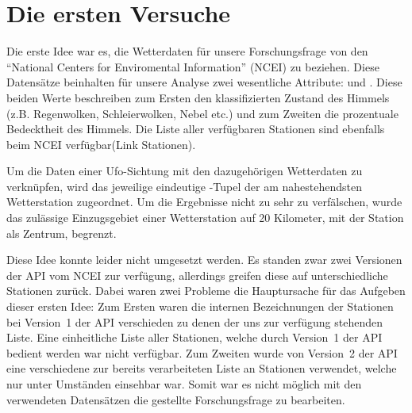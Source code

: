 \section{Die ersten Versuche} \label{versuch1}  %

Die erste Idee war es, die Wetterdaten für unsere Forschungsfrage von den \enquote{National Centers for Enviromental Information} (NCEI) zu beziehen. Diese Datensätze beinhalten für unsere Analyse zwei wesentliche Attribute:  und . Diese beiden Werte beschreiben zum Ersten den klassifizierten Zustand des Himmels (z.B. Regenwolken, Schleierwolken, Nebel etc.) und zum Zweiten die prozentuale Bedecktheit des Himmels. Die Liste aller verfügbaren Stationen sind ebenfalls beim NCEI verfügbar(Link Stationen).

Um die Daten einer Ufo-Sichtung mit den dazugehörigen Wetterdaten zu verknüpfen, wird das jeweilige eindeutige -Tupel der am nahestehendsten Wetterstation zugeordnet. Um die Ergebnisse nicht zu sehr zu verfälschen, wurde das zulässige Einzugsgebiet einer Wetterstation auf 20 Kilometer, mit der Station als Zentrum, begrenzt.

Diese Idee konnte leider nicht umgesetzt werden. Es standen zwar zwei Versionen der API vom NCEI zur verfügung, allerdings greifen diese auf unterschiedliche Stationen zurück. Dabei waren zwei Probleme die Hauptursache für das Aufgeben dieser ersten Idee: Zum Ersten waren die internen Bezeichnungen der Stationen bei Version~1 der API verschieden zu denen der uns zur verfügung stehenden Liste. Eine einheitliche Liste aller Stationen, welche durch Version~1 der API bedient werden war nicht verfügbar. Zum Zweiten wurde von Version~2 der API eine verschiedene zur bereits verarbeiteten Liste an Stationen verwendet, welche nur unter Umständen einsehbar war. Somit war es nicht möglich mit den verwendeten Datensätzen die gestellte Forschungsfrage zu bearbeiten.
